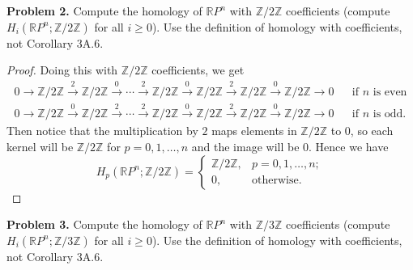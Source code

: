 \documentclass[leqno]{article}
\theoremstyle{nonumberplain}
\newtheorem{proof}{Proof}
\newcommand{\R}{\mathbb{R}}
\newcommand{\Z}{\mathbb{Z}}
\begin{document}
\vspace*{1cm}


\noindent\textbf{Problem 2.} 
Compute the homology of $\R P^n$ with $\Z/2\Z$ coefficients (compute $H_i(\R P^n; \Z / 2\Z)$ for all $i\geq 0$). Use the definition of homology with coefficients, not Corollary 3A.6.

\begin{proof}
Doing this with $\Z / 2\Z$ coefficients, we get
\begin{align*}
0\rightarrow \Z/2\Z \xrightarrow{2} \Z/2\Z \xrightarrow{0} \cdots \xrightarrow{2} \Z/2\Z \xrightarrow{0} \Z/2\Z \xrightarrow{2} \Z/2\Z \xrightarrow{0} \Z/2\Z \rightarrow 0 && \textrm{if $n$ is even}\\
0\rightarrow \Z/2\Z \xrightarrow{0} \Z/2\Z \xrightarrow{2} \cdots \xrightarrow{2} \Z/2\Z \xrightarrow{0} \Z/2\Z \xrightarrow{2} \Z/2\Z \xrightarrow{0} \Z/2\Z \rightarrow 0 && \textrm{if $n$ is odd.}
\end{align*}
Then notice that the multiplication by $2$ maps elements in $\Z/2\Z$ to $0$, so each kernel will be $\Z/2\Z$ for $p=0,1,\dots,n$ and the image will be $0$.  Hence we have
\[
H_p(\R P^n;\Z/2\Z)=
\begin{cases}
\Z/2\Z,& p=0,1,\dots,n;\\
0, &\textrm{otherwise}.
\end{cases}
\]
\end{proof}

\vspace*{1cm}


\noindent\textbf{Problem 3.} 
Compute the homology of $\R P^n$ with $\Z/3\Z$ coefficients (compute $H_i(\R P^n; \Z / 3\Z)$ for all $i\geq 0$). Use the definition of homology with coefficients, not Corollary 3A.6.
\end{document}
